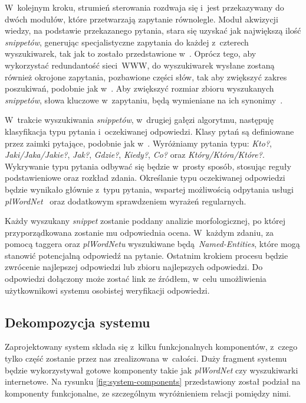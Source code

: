 W~kolejnym kroku, strumień sterowania rozdwaja się i~jest przekazywany do dwóch modułów, które przetwarzają zapytanie równolegle. Moduł akwizycji wiedzy, na podstawie przekazanego pytania, stara się uzyskać jak największą ilość \emph{snippetów}, generując specjalistyczne zapytania do każdej z~czterech wyszukiwarek, tak jak to zostało przedstawione w~\cite{zheng2002answerbus}. Oprócz tego, aby wykorzystać redundantość sieci~WWW, do wyszukiwarek wysłane zostaną również okrojone zapytania, pozbawione części słów, tak aby zwiększyć zakres poszukiwań, podobnie jak w~\cite{brill2002analysis}. Aby zwiększyć rozmiar zbioru wyszukanych \emph{snippetów}, słowa kluczowe w~zapytaniu, będą wymieniane na ich synonimy~\cite{przybyla-2013-question}.

W~trakcie wyszukiwania \emph{snippetów}, w~drugiej gałęzi algorytmu, następuję klasyfikacja typu pytania i~oczekiwanej odpowiedzi. Klasy pytań są definiowane przez zaimki pytające, podobnie jak w~\cite{gupta2012survey}. Wyróżniamy pytania typu: \emph{Kto?}, \emph{Jaki/Jaka/Jakie?}, \emph{Jak?}, \emph{Gdzie?}, \emph{Kiedy?}, \emph{Co?} oraz \emph{Który/Która/Które?}. Wykrywanie typu pytania odbywać się będzie w~prosty sposób, stosując reguły podstawieniowe oraz rozkład zdania. Określanie typu oczekiwanej odpowiedzi będzie wynikało głównie z~typu pytania, wspartej możliwością odpytania usługi \emph{plWordNet}~\cite{MazPiaRudSzpaKedz:16} oraz dodatkowym sprawdzeniem wyrażeń regularnych.

Każdy wyszukany \emph{snippet} zostanie poddany analizie morfologicznej, po której przyporządkowana zostanie mu odpowiednia ocena. W~każdym zdaniu, za pomocą taggera oraz \emph{plWordNetu} wyszukiwane będą \emph{Named-Entities}, które mogą stanowić potencjalną odpowiedź na pytanie. Ostatnim krokiem procesu będzie zwrócenie najlepszej odpowiedzi lub zbioru najlepszych odpowiedzi. Do odpowiedzi dołączony może zostać link ze źródłem, w~celu umożliwienia użytkownikowi systemu osobistej weryfikacji odpowiedzi.

\subsection{Dekompozycja systemu}
Zaprojektowany system składa się z~kilku funkcjonalnych komponentów, z~czego tylko część zostanie przez nas zrealizowana w~całości. Duży fragment systemu będzie wykorzystywał gotowe komponenty takie jak \emph{plWordNet} czy wyszukiwarki internetowe. Na rysunku \ref{fig:system-components} przedstawiony został podział na komponenty funkcjonalne, ze szczególnym wyróżnieniem relacji pomiędzy nimi.

